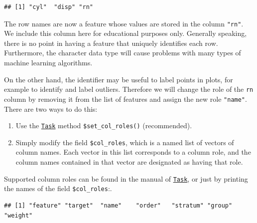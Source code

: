 \documentclass[
]{scrbook}
\newenvironment{Shaded}{\begin{snugshade}}{\end{snugshade}}
\newcommand{\AttributeTok}[1]{\textcolor[rgb]{0.77,0.63,0.00}{#1}}
\newcommand{\CommentTok}[1]{\textcolor[rgb]{0.56,0.35,0.01}{\textit{#1}}}
\newcommand{\FunctionTok}[1]{\textcolor[rgb]{0.00,0.00,0.00}{#1}}
\newcommand{\NormalTok}[1]{#1}
\newcommand{\SpecialCharTok}[1]{\textcolor[rgb]{0.00,0.00,0.00}{#1}}
\newcommand{\StringTok}[1]{\textcolor[rgb]{0.31,0.60,0.02}{#1}}
\providecommand{\tightlist}{%
  \setlength{\itemsep}{0pt}\setlength{\parskip}{0pt}}
\renewenvironment{Shaded} {\begin{snugshade}\small} {\end{snugshade}}
\begin{document}
\begin{verbatim}
## [1] "cyl"  "disp" "rn"
\end{verbatim}

The row names are now a feature whose values are stored in the column \texttt{"rn"}.
We include this column here for educational purposes only.
Generally speaking, there is no point in having a feature that uniquely identifies each row.
Furthermore, the character data type will cause problems with many types of machine learning algorithms.

On the other hand, the identifier may be useful to label points in plots, for example to identify and label outliers.
Therefore we will change the role of the \texttt{rn} column by removing it from the list of features and assign the new role \texttt{"name"}.
There are two ways to do this:

\begin{enumerate}
\def\labelenumi{\arabic{enumi}.}
\tightlist
\item
  Use the \href{https://mlr3.mlr-org.com/reference/Task.html}{\texttt{Task}} method \texttt{\$set\_col\_roles()} (recommended).
\item
  Simply modify the field \texttt{\$col\_roles}, which is a named list of vectors of column names.
  Each vector in this list corresponds to a column role, and the column names contained in that vector are designated as having that role.
\end{enumerate}

Supported column roles can be found in the manual of \href{https://mlr3.mlr-org.com/reference/Task.html}{\texttt{Task}}, or just by printing the names of the field \texttt{\$col\_roles}:.

\begin{Shaded}
\end{Shaded}

\begin{verbatim}
## [1] "feature" "target"  "name"    "order"   "stratum" "group"   "weight"
\end{verbatim}

\begin{Shaded}
\end{Shaded}
\end{document}

